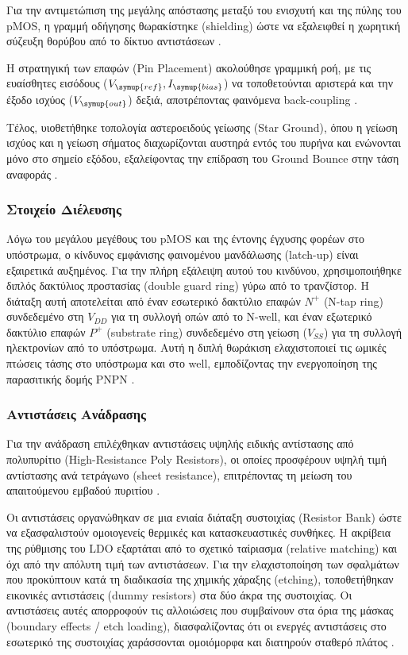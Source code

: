 Για την αντιμετώπιση της μεγάλης απόστασης μεταξύ του ενισχυτή και της πύλης του pMOS, η γραμμή οδήγησης θωρακίστηκε (shielding) ώστε να εξαλειφθεί η χωρητική σύζευξη θορύβου από το δίκτυο αντιστάσεων \cite{RazaviCMOS}.

Η στρατηγική των επαφών (Pin Placement) ακολούθησε γραμμική ροή, με τις ευαίσθητες εισόδους ($V_{\symup{ref}}, I_{\symup{bias}}$) να τοποθετούνται αριστερά και την έξοδο ισχύος ($V_{\symup{out}}$) δεξιά, αποτρέποντας φαινόμενα back-coupling \cite{BakerJacob}.

Τέλος, υιοθετήθηκε τοπολογία αστεροειδούς γείωσης (Star Ground), όπου η γείωση ισχύος και η γείωση σήματος διαχωρίζονται αυστηρά εντός του πυρήνα και ενώνονται μόνο στο σημείο εξόδου, εξαλείφοντας την επίδραση του Ground Bounce στην τάση αναφοράς \cite{GrayMeyer}.


\subsubsection{Στοιχείο Διέλευσης}

Λόγω του μεγάλου μεγέθους του pMOS και της έντονης έγχυσης φορέων στο υπόστρωμα, ο κίνδυνος εμφάνισης φαινομένου μανδάλωσης (latch-up) είναι εξαιρετικά αυξημένος. Για την πλήρη εξάλειψη αυτού του κινδύνου, χρησιμοποιήθηκε διπλός δακτύλιος προστασίας (double guard ring) γύρω από το τρανζίστορ. Η διάταξη αυτή αποτελείται από έναν εσωτερικό δακτύλιο επαφών $N^+$ (N-tap ring) συνδεδεμένο στη $V_{DD}$ για τη συλλογή οπών από το N-well, και έναν εξωτερικό δακτύλιο επαφών $P^+$ (substrate ring) συνδεδεμένο στη γείωση ($V_{SS}$) για τη συλλογή ηλεκτρονίων από το υπόστρωμα. Αυτή η διπλή θωράκιση ελαχιστοποιεί τις ωμικές πτώσεις τάσης στο υπόστρωμα και στο well, εμποδίζοντας την ενεργοποίηση της παρασιτικής δομής PNPN \cite{AlanHasting}.

\subsubsection{Αντιστάσεις Ανάδρασης}
Για την ανάδραση επιλέχθηκαν αντιστάσεις υψηλής ειδικής αντίστασης από πολυπυρίτιο (High-Resistance Poly Resistors), οι οποίες προσφέρουν υψηλή τιμή αντίστασης ανά τετράγωνο (sheet resistance), επιτρέποντας τη μείωση του απαιτούμενου εμβαδού πυριτίου \cite{BakerJacob}.

Οι αντιστάσεις οργανώθηκαν σε μια ενιαία διάταξη συστοιχίας (Resistor Bank) ώστε να εξασφαλιστούν ομοιογενείς θερμικές και κατασκευαστικές συνθήκες. Η ακρίβεια της ρύθμισης του LDO εξαρτάται από το σχετικό ταίριασμα (relative matching) και όχι από την απόλυτη τιμή των αντιστάσεων. Για την ελαχιστοποίηση των σφαλμάτων που προκύπτουν κατά τη διαδικασία της χημικής χάραξης (etching), τοποθετήθηκαν εικονικές αντιστάσεις (dummy resistors) στα δύο άκρα της συστοιχίας. Οι αντιστάσεις αυτές απορροφούν τις αλλοιώσεις που συμβαίνουν στα όρια της μάσκας (boundary effects / etch loading), διασφαλίζοντας ότι οι ενεργές αντιστάσεις στο εσωτερικό της συστοιχίας χαράσσονται ομοιόμορφα και διατηρούν σταθερό πλάτος \cite{AlanHasting}.

